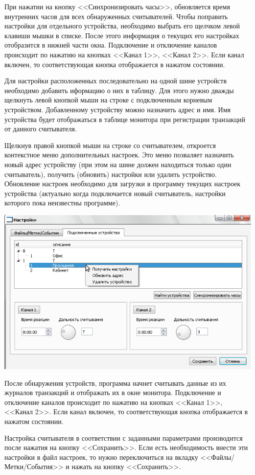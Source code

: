 При нажатии на кнопку <<Синхронизировать часы>>, обновляется время внутренних часов для всех обнаруженных считывателей.
Чтобы поправить настройки для отдельного устройства, необходимо выбрать его щелчком левой клавиши мышки в списке.
После этого информация о текущих его настройках отобразится в нижней части окна. 
Подключение и отключение каналов происходит по нажатию на кнопках <<Канал 1>>, <<Канал 2>>.
Если канал включен, то соответствующая кнопка отображается в нажатом состоянии.

Для настройки расположенных последовательно на одной шине устройств необходимо добавить иформацию о них в таблицу. 
Для этого нужно дважды щелкнуть левой кнопкой мыши на строке с подключенным корневым устройством. Добавленному устройству
можно назначить адрес и имя. Имя устройства будет отображаться в таблице монитора при регистрации транзакций от данного считывателя.

Щелкнув правой кнопкой мыши на строке со считывателем, откроется контекстное меню дополнительных настроек. Это меню позваляет назначить новый
адрес устройству (при этом на шине должен находиться только один считыватель), получить (обновить) настройки или удалить устройство. 
Обновление настроек необходимо для загрузки в программу текущих настроек устройства 
(актуально когда подключается новый считыватель, настройки которого пока неизвестны программе).

\begin{center}
    \includegraphics[scale=0.5]{img/settings_context.png}
\end{center}

После обнаружения устройств, программа начнет считывать данные из их журналов транзакций и 
отображать их в окне монитора. Подключение и отключение каналов происходит по нажатию на кнопках <<Канал 1>>, <<Канал 2>>.
Если канал включен, то соответствующая кнопка отображается в нажатом состоянии.

Настройка считывателя в соответствии с заданными параметрами производится после нажатия на кнопку <<Сохранить>>.
Если есть необходимость внести эти настройки в файл настроек, то нужно переключиться на вкладку <<Файлы/Метки/События>>
 и нажать на кнопку <<Сохранить>>.

